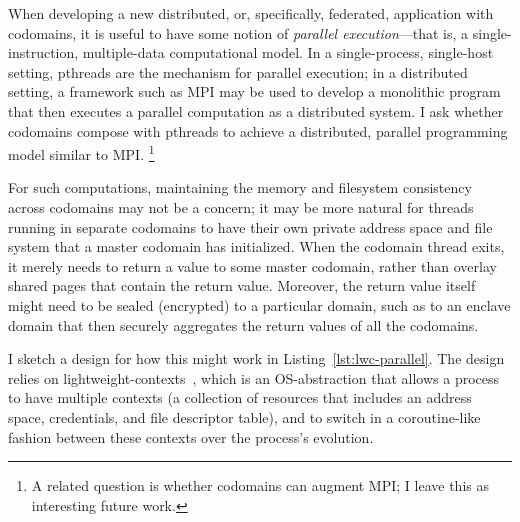 %
%
When developing a new distributed, or, specifically, federated, application
with codomains, it is useful to have some notion of \emph{parallel
execution}---that is, a single-instruction, multiple-data computational model.
%
In a single-process, single-host setting, pthreads are the mechanism for
parallel execution; in a distributed setting, a framework such as MPI
may be used to develop a monolithic program that then executes a parallel
computation as a distributed system.
%
I ask whether codomains compose with pthreads to achieve a distributed,
parallel programming model similar to MPI.  \footnote{A related question is
whether codomains can augment MPI; I leave this as interesting future work.
}


For such computations, maintaining the memory and filesystem consistency across
codomains may not be a concern; it may be more natural for threads running in
separate codomains to have their own private address space and file system that
a master codomain has initialized.
%
When the codomain thread exits, it merely needs to return a value to some
master codomain, rather than overlay shared pages that contain the return
value.
%
%
Moreover, the return value itself might need to be sealed (encrypted) to a
particular domain, such as to an enclave domain that then securely aggregates
the return values of all the codomains.


I sketch a design for how this might work in Listing~\ref{lst:lwc-parallel}.
%
The design relies on lightweight-contexts~\cite{lwcs}, which is an
OS-abstraction that allows a process to have multiple contexts (a collection of
resources that includes an address space, credentials, and file descriptor table),
and to switch in a coroutine-like fashion between these contexts over the
process's evolution.
%



